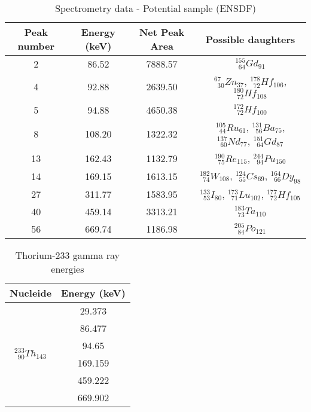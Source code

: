 \renewcommand{\arraystretch}{2}
\begin{table}[!htb]
    \centering
        \begin{tabular}{cccc}
        \hline
        Peak number & Energy (keV) & Net Peak Area & Possible daughters \\ \hline\hline
		2           & 86.52        & 7888.57       & $^{155}_{\phantom{0}64}Gd_{91}$ \\
		4           & 92.88        & 2639.50       & $^{67}_{\phantom{0}30}Zn_{37}$, $^{178}_{\phantom{0}72}Hf_{106}$, $^{180}_{\phantom{0}72}Hf_{108}$ \\
		5           & 94.88        & 4650.38       & $^{172}_{\phantom{0}72}Hf_{100}$ \\
		8           & 108.20       & 1322.32       & $^{105}_{\phantom{0}44}Ru_{61}$, $^{131}_{\phantom{0}56}Ba_{75}$, $^{137}_{\phantom{0}60}Nd_{77}$, $^{151}_{\phantom{0}64}Gd_{87}$ \\
		13          & 162.43       & 1132.79       & $^{190}_{\phantom{0}75}Re_{115}$, $^{244}_{\phantom{0}94}Pu_{150}$ \\
		14          & 169.15       & 1613.15       & $^{182}_{\phantom{0}74}W_{108}$, $^{124}_{\phantom{0}55}Cs_{69}$, $^{164}_{\phantom{0}66}Dy_{98}$ \\
		27          & 311.77       & 1583.95       & $^{133}_{\phantom{0}53}I_{80}$, $^{173}_{\phantom{0}71}Lu_{102}$, $^{177}_{\phantom{0}72}Hf_{105}$\\
		40          & 459.14       & 3313.21       & $^{183}_{\phantom{0}73}Ta_{110}$\\
		56          & 669.74       & 1186.98       & $^{205}_{\phantom{0}84}Po_{121}$
        \end{tabular}
        \caption{Spectrometry data - Potential sample (ENSDF)}\label{tab:specdata_d}
\end{table}


\begin{table}[!htb]
    \centering
        \begin{tabular}{cc}
        \hline
        Nucleide    & Energy (keV) \\ \hline\hline
		\multirow{6}{*}{$^{233}_{\phantom{0}90}Th_{143}$}  & 29.373      \\
		                                                   & 86.477      \\
		                                                   & 94.65      \\
		                                                   & 169.159      \\
		                                                   & 459.222      \\
		                                                   & 669.902      
        \end{tabular}
        \caption{Thorium-233 gamma ray energies}\label{tab:lnhb_th}
\end{table}


